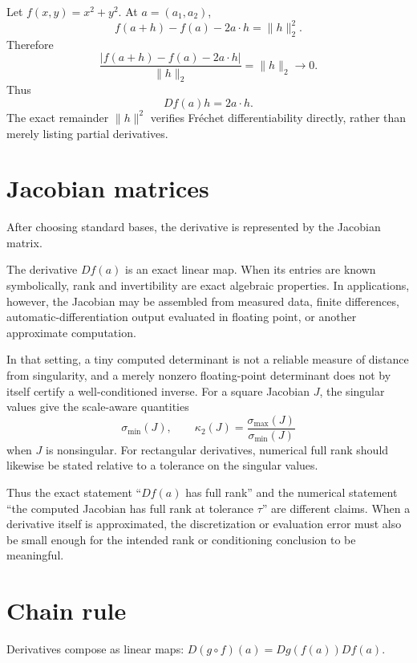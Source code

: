 \begin{example}\label{ex:ii08-expand-01}
Let \(f(x,y)=x^2+y^2\). At \(a=(a_1,a_2)\),
\[
f(a+h)-f(a)-2a\cdot h=\|h\|_2^2.
\]
Therefore
\[
\frac{|f(a+h)-f(a)-2a\cdot h|}{\|h\|_2}
=\|h\|_2\to0.
\]
Thus
\[
Df(a)h=2a\cdot h.
\]
The exact remainder \(\|h\|^2\) verifies Fréchet differentiability directly,
rather than merely listing partial derivatives.
\end{example}
\section{Jacobian matrices}
After choosing standard bases, the derivative is represented by the Jacobian matrix.

\begin{remark}
The derivative \(Df(a)\) is an exact linear map.  When its entries are known
symbolically, rank and invertibility are exact algebraic properties.  In
applications, however, the Jacobian may be assembled from measured data,
finite differences, automatic-differentiation output evaluated in floating
point, or another approximate computation.

In that setting, a tiny computed determinant is not a reliable measure of
distance from singularity, and a merely nonzero floating-point determinant
does not by itself certify a well-conditioned inverse.  For a square Jacobian
\(J\), the singular values give the scale-aware quantities
\[
\sigma_{\min}(J),
\qquad
\kappa_2(J)=\frac{\sigma_{\max}(J)}{\sigma_{\min}(J)}
\]
when \(J\) is nonsingular.  For rectangular derivatives, numerical full rank
should likewise be stated relative to a tolerance on the singular values.

Thus the exact statement ``\(Df(a)\) has full rank'' and the numerical
statement ``the computed Jacobian has full rank at tolerance \(\tau\)'' are
different claims.  When a derivative itself is approximated, the
discretization or evaluation error must also be small enough for the intended
rank or conditioning conclusion to be meaningful.
\end{remark}

\section{Chain rule}
Derivatives compose as linear maps: $D(g\circ f)(a)=Dg(f(a))Df(a)$.


